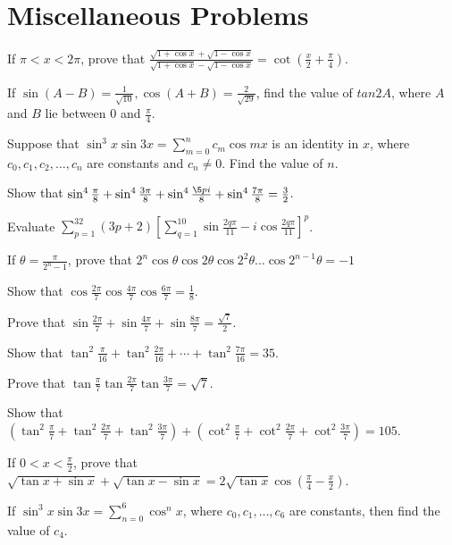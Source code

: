 \chapter{Miscellaneous Problems}
\startitemize[n, 1*broad]
\item If $\pi < x < 2\pi$, prove that $\frac{\sqrt{1 + \cos x} + \sqrt{1 - \cos x}}{\sqrt{1 + \cos x} -
    \sqrt{1 - \cos x}} = \cot\left(\frac{x}{2} + \frac{\pi}{4}\right)$.
\item If $\sin(A - B) = \frac{1}{\sqrt{10}}, \cos(A + B) = \frac{2}{\sqrt{29}}$, find the value of $tan2A$,
  where $A$ and $B$ lie between $0$ and $\frac{\pi}{4}$.
\item Suppose that $\sin^3x\sin3x = \displaystyle\sum_{m = 0}^nc_m\cos mx$ is an identity in $x$, where
  $c_0, c_1, c_2, \ldots, c_n$ are constants and $c_n \neq 0$. Find the value of $n$.
\item Show that $\sin^4\frac{\pi}{8} + \sin^4\frac{3\pi}{8} + \sin^4\frac{\5pi}{8} + \sin^4\frac{7\pi}{8}
  = \frac{3}{2}$.
\item Evaluate $\displaystyle\sum_{p = 1}^{32}(3p + 2)\left[\displaystyle\sum_{q = 1
  }^{10}\sin\frac{2q\pi}{11} - i\cos\frac{2q\pi}{11}\right]^p$.
\item If $\theta = \frac{\pi}{2^n - 1}$, prove that $2^n\cos\theta\cos2\theta\cos2^2\theta\ldots\cos2^{n -
  1}\theta = -1$
\item Show that $\cos\frac{2\pi}{7}\cos\frac{4\pi}{7}\cos\frac{6\pi}{7} = \frac{1}{8}$.
\item Prove that $\sin\frac{2\pi}{7} + \sin\frac{4\pi}{7} + \sin\frac{8\pi}{7} = \frac{\sqrt{7}}{2}$.
\item Show that $\tan^2\frac{\pi}{16} + \tan^2\frac{2\pi}{16} + \cdots + \tan^2\frac{7\pi}{16} = 35$.
\item Prove that $\tan\frac{\pi}{7}\tan\frac{2\pi}{7}\tan\frac{3\pi}{7} = \sqrt{7}$.
\item Show that $\left(\tan^2\frac{\pi}{7} + \tan^2\frac{2\pi}{7} + \tan^2\frac{3\pi}{7}\right)
  + \left(\cot^2\frac{\pi}{7} + \cot^2\frac{2\pi}{7} + \cot^2\frac{3\pi}{7}\right) = 105$.
\item If $0 < x < \frac{\pi}{2}$, prove that $\sqrt{\tan x + \sin x} + \sqrt{\tan x - \sin x} = 2\sqrt{\tan
  x}\cos\left(\frac{\pi}{4} - \frac{x}{2}\right)$.
\item If $\sin^3x\sin3x = \displaystyle\sum_{n = 0}^6\cos^nx$, where $c_0, c_1, \ldots, c_6$ are constants,
  then find the value of $c_4$.

